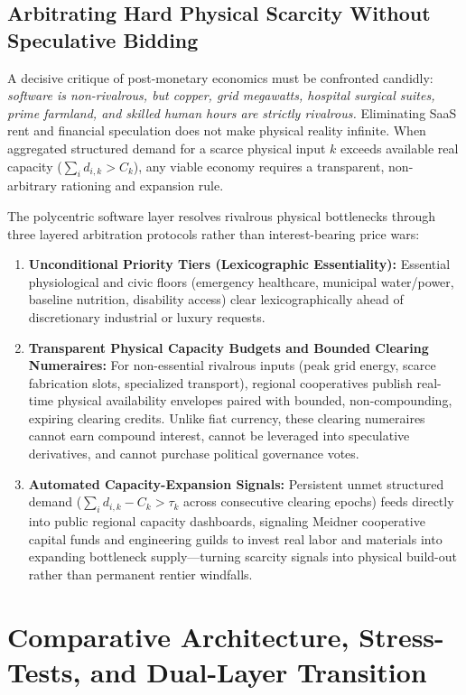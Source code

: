 \documentclass[11pt]{article}
\begin{document}
\subsection{Arbitrating Hard Physical Scarcity Without Speculative Bidding}

A decisive critique of post-monetary economics must be confronted candidly: \emph{software is non-rivalrous, but copper, grid megawatts, hospital surgical suites, prime farmland, and skilled human hours are strictly rivalrous.} Eliminating SaaS rent and financial speculation does not make physical reality infinite. When aggregated structured demand for a scarce physical input $k$ exceeds available real capacity ($\sum_i d_{i,k} > C_k$), any viable economy requires a transparent, non-arbitrary rationing and expansion rule.

The polycentric software layer resolves rivalrous physical bottlenecks through three layered arbitration protocols rather than interest-bearing price wars:
\begin{enumerate}
  \item \textbf{Unconditional Priority Tiers (Lexicographic Essentiality):} Essential physiological and civic floors (emergency healthcare, municipal water/power, baseline nutrition, disability access) clear lexicographically ahead of discretionary industrial or luxury requests.
  \item \textbf{Transparent Physical Capacity Budgets and Bounded Clearing Numeraires:} For non-essential rivalrous inputs (peak grid energy, scarce fabrication slots, specialized transport), regional cooperatives publish real-time physical availability envelopes paired with bounded, non-compounding, expiring clearing credits. Unlike fiat currency, these clearing numeraires cannot earn compound interest, cannot be leveraged into speculative derivatives, and cannot purchase political governance votes.
  \item \textbf{Automated Capacity-Expansion Signals:} Persistent unmet structured demand ($\sum_i d_{i,k} - C_k > \tau_k$ across consecutive clearing epochs) feeds directly into public regional capacity dashboards, signaling Meidner cooperative capital funds and engineering guilds to invest real labor and materials into expanding bottleneck supply---turning scarcity signals into physical build-out rather than permanent rentier windfalls.
\end{enumerate}

\section{Comparative Architecture, Stress-Tests, and Dual-Layer Transition}\label{sec:comparison}
\end{document}
